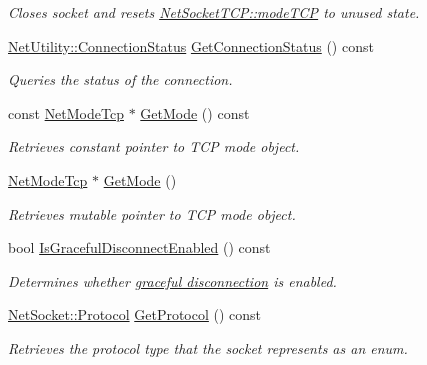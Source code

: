 \begin{DoxyCompactItemize}
\begin{DoxyCompactList}\small\item\em Closes socket and resets \hyperlink{class_net_socket_t_c_p_aafcdf2d4234f269eab1c9d43955e99bc}{NetSocketTCP::modeTCP} to unused state. \item\end{DoxyCompactList}\item 
\hyperlink{class_net_utility_a7eae52138f8bd597ffc67ebf07e86b6d}{NetUtility::ConnectionStatus} \hyperlink{class_net_socket_t_c_p_a68dc0183e216cdd1796466d411f0b681}{GetConnectionStatus} () const 
\begin{DoxyCompactList}\small\item\em Queries the status of the connection. \item\end{DoxyCompactList}\item 
const \hyperlink{class_net_mode_tcp}{NetModeTcp} $\ast$ \hyperlink{class_net_socket_t_c_p_ad528efe4a16f0a110f488820d7abbc89}{GetMode} () const 
\begin{DoxyCompactList}\small\item\em Retrieves constant pointer to TCP mode object. \item\end{DoxyCompactList}\item 
\hyperlink{class_net_mode_tcp}{NetModeTcp} $\ast$ \hyperlink{class_net_socket_t_c_p_a75ede4ec55e9e9ec49a0f31da51e2dd3}{GetMode} ()
\begin{DoxyCompactList}\small\item\em Retrieves mutable pointer to TCP mode object. \item\end{DoxyCompactList}\item 
bool \hyperlink{class_net_socket_t_c_p_a00ea1a6922eb6cf69e23a1992752685c}{IsGracefulDisconnectEnabled} () const 
\begin{DoxyCompactList}\small\item\em Determines whether \hyperlink{graceful_disconnect_page}{graceful disconnection} is enabled. \item\end{DoxyCompactList}\item 
\hyperlink{class_net_socket_simple_a31450636f6fb9ece239c50f616e0d7b0}{NetSocket::Protocol} \hyperlink{class_net_socket_t_c_p_ac599af5903f2a92f481f41ad1466390d}{GetProtocol} () const 
\begin{DoxyCompactList}\small\item\em Retrieves the protocol type that the socket represents as an enum. \item\end{DoxyCompactList}\item 

\end{DoxyCompactItemize}
